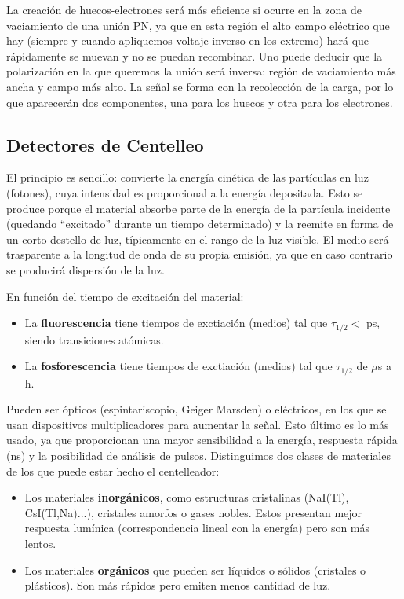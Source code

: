 La creación de huecos-electrones será más eficiente si ocurre en la zona de vaciamiento de una unión PN, ya que en esta región el alto campo eléctrico que hay (siempre y cuando apliquemos voltaje inverso en los extremo) hará que rápidamente se muevan y no se puedan recombinar. Uno puede deducir que la polarización en la que queremos la unión será inversa: región de vaciamiento más ancha y campo más alto. La señal se forma con la recolección de la carga, por lo que aparecerán dos componentes, una para los huecos y otra para los electrones. 


\subsection{Detectores de Centelleo}

El principio es sencillo: convierte la energía cinética de las partículas en luz (fotones), cuya intensidad es proporcional a la energía depositada.  Esto se produce porque el material absorbe parte de la energía de la partícula incidente (quedando ``excitado'' durante un tiempo determinado) y la reemite en forma de un corto destello de luz, típicamente en el rango de la luz visible. El medio será trasparente a la longitud de onda de su propia emisión, ya que en caso contrario se producirá dispersión de la luz. 


En función del tiempo de excitación del material:

\begin{itemize}
    \item La \textbf{fluorescencia} tiene tiempos de exctiación (medios) tal que $\tau_{1/2} <$ ps, siendo transiciones atómicas.
    \item La \textbf{fosforescencia} tiene tiempos de exctiación (medios) tal que $\tau_{1/2}$ de $\mu$s a h.
\end{itemize}
Pueden ser ópticos (espintariscopio, Geiger Marsden) o eléctricos, en los que se usan dispositivos multiplicadores para aumentar la señal. Esto último es lo más usado, ya que proporcionan una mayor sensibilidad a la energía, respuesta rápida (ns) y la posibilidad de análisis de pulsos. Distinguimos dos clases de materiales de los que puede estar hecho el centelleador:

\begin{itemize}
    \item Los materiales \textbf{inorgánicos}, como estructuras cristalinas (NaI(Tl), CsI(Tl,Na)...), cristales amorfos o gases nobles. Estos presentan mejor respuesta lumínica (correspondencia lineal con la energía) pero son más lentos.
    \item Los materiales \textbf{orgánicos} que pueden ser líquidos o sólidos (cristales o plásticos). Son más rápidos pero emiten menos cantidad de luz. 
\end{itemize}


